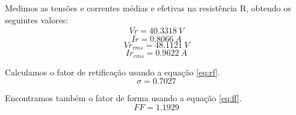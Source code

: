 \documentclass{report}
\begin{document}
Medimos as tensões e correntes médias e efetivas na resistência R, obtendo os seguintes valores:
\begin{equation}
\overline{Vr} = 40.3318\ V
\end{equation}
\begin{equation}
\overline{Ir} =  0.8066\ A
\end{equation}
\begin{equation}
Vr_{rms} =  48.1121\ V
\end{equation}
\begin{equation}
Ir_{rms} =   0.9622\ A
\end{equation}

Calculamos o fator de retificação usando a equação \ref{eq:rf}.
\begin{equation}
\sigma = 0.7027
\end{equation}

Encontramos também o fator de forma usando a equação \ref{eq:ff}.
\begin{equation}
FF = 1.1929
\end{equation}
\end{document}
